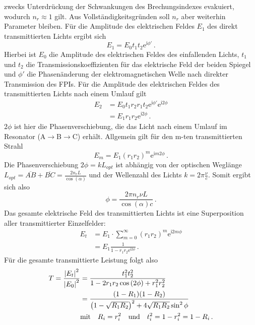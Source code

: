 zwecks Unterdrückung der Schwankungen des Brechungsindexes evakuiert, wodurch
$n_r\approx1$ gilt. Aus Vollständigkeitsgründen soll $n_r$ aber weiterhin
Parameter bleiben. Für die Amplitude des elektrischen Feldes $E_1$ des direkt
transmittierten Lichts ergibt sich
\begin{equation}\label{eq:FPI_E1}
	E_1=E_0t_1t_2\mathrm{e}^{\mathrm{i}\phi'}\,.
\end{equation}
Hierbei ist $E_0$ die Amplitude des elektrischen Feldes des einfallenden Lichts,
$t_1$ und $t_2$ die Transmissionskoeffizienten für das elektrische Feld
der beiden Spiegel und $\phi'$ die Phasenänderung der elektromagnetischen Welle
nach direkter Transmission des FPIs. Für die Amplitude des elektrischen Feldes des
transmittierten Lichts nach einem Umlauf gilt
\begin{equation}\label{eq:FPI_E2}
	\begin{split}
		E_2
		&=E_0t_1r_2r_1t_2\mathrm{e}^{\mathrm{i}\phi'}\mathrm{e}^{\mathrm{i}2\phi}\\
		&=E_1r_1r_2\mathrm{e}^{\mathrm{i}2\phi}\,.
	\end{split}
\end{equation}
$2\phi$ ist hier die Phasenverschiebung, die das Licht nach einem Umlauf im
Resonator (A$\rightarrow$B$\rightarrow$C) erhält. Allgemein gilt für den m-ten
transmittierten Strahl
\begin{equation}\label{eq:FPI_Em}
	E_m=E_1(r_1r_2)^m\mathrm{e}^{\mathrm{i}m2\phi}\,.
\end{equation}
Die Phasenverschiebung $2\phi=kL_{opt}$ ist abhängig von der optischen Weglänge
$L_{opt}=\overline{AB}+\overline{BC}=\frac{2n_rL}{\cos{(\alpha)}}$ und der Wellenzahl des
Lichts $k=2\pi\frac{\nu}{c}$. Somit ergibt sich also
\begin{equation}\label{eq:FPI_phase}
	\phi=\frac{2\pi n_r\nu L}{\cos{(\alpha)}c}\,.
\end{equation}
Das gesamte elektrische Feld des transmittierten Lichts ist eine Superposition
aller transmittierter Einzelfelder:
\begin{equation}\label{eq:FPI_Et}
	\begin{split}
		E_t
		&=E_1\cdot\sum\limits_{m=0}^\infty(r_1r_2)^m\mathrm{e}^{\mathrm{i}2m\phi}\\
		&=E_1\frac{1}{1-r_1r_2\mathrm{e}^{\mathrm{i}2\phi}}\,.
	\end{split}
\end{equation}
Für die gesamte transmittierte Leistung folgt also
\begin{equation}\label{eq:FPI_transmission}
	\begin{split}
		T=\frac{\left|E_t\right|^2}{\left|E_0\right|^2}
		&=\frac{t_1^2t_2^2}{1-2r_1r_2\cos{(2\phi)}+r_1^2r_2^2}\\
		&=\frac{(1-R_1)(1-R_2)}{\left(1-\sqrt{R_1R_2}\right)^2+4\sqrt{R_1R_2}\sin^2{\phi}}\\
		&\text{mit}\quad
		R_i=r_i^2
		\quad\text{und}\quad
		t_i^2=1-r_i^2=1-R_i\,.
	\end{split}
\end{equation}
